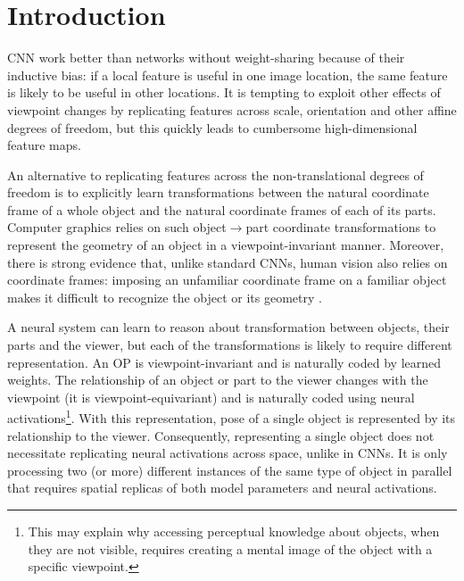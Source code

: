 \vspace*{-1em}
\section{Introduction}
% 
\Gls{CNN} work better than networks without weight-sharing because of their inductive bias: if a local feature is useful in one image location, the same feature is likely to be useful in other locations. It is tempting to exploit other effects of viewpoint changes by replicating features across scale, orientation and other affine degrees of freedom, but this quickly leads to cumbersome high-dimensional feature maps. %

An alternative to replicating features across the non-translational degrees of freedom is to explicitly learn transformations between the natural coordinate frame of a whole object and the natural coordinate frames of each of its parts.   Computer graphics relies on such object$\rightarrow$part coordinate transformations to represent the geometry of an object in a viewpoint-invariant manner. Moreover, there is strong evidence that, unlike standard \gls{CNN}s, human vision also relies on coordinate frames: imposing an unfamiliar coordinate frame on a familiar object makes it difficult to recognize the object or its geometry \citep{Rock73, Hinton79}.

A neural system can learn to reason about transformation between objects, their parts and the viewer, but each of the transformations is likely to require different representation.
An \gls{OP} is viewpoint-invariant and is naturally coded by learned weights.  
The relationship of an object or part to the viewer changes with the viewpoint (it is viewpoint-equivariant) and is naturally coded using neural activations\footnote{
    This may explain why accessing perceptual knowledge about objects, when they are not visible, requires creating a mental image of the object with a specific viewpoint.
}.
With this representation, pose of a single object is represented by its relationship to the viewer.
Consequently, representing a single object does not necessitate replicating neural activations across space, unlike in \glspl{CNN}.
It is only processing two (or more) different instances of the same type of object in parallel that requires spatial replicas of both model parameters and neural activations.

